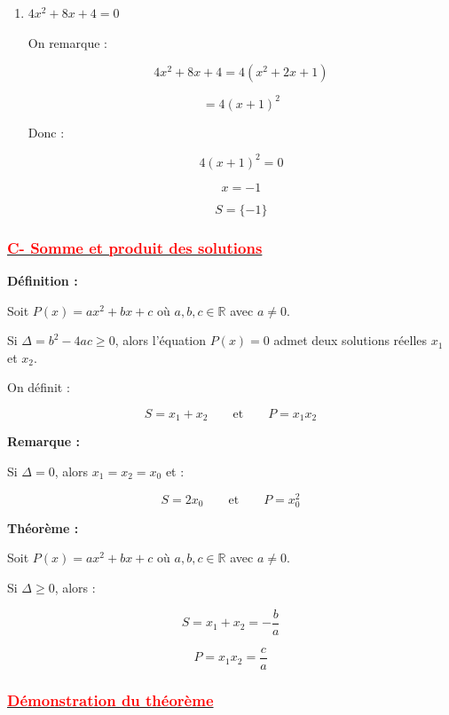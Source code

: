\documentclass[12pt,a4paper]{article}
\newcounter{solution}
\newcounter{remarque}
\begin{document}
\begin{enumerate}
\[
\Delta = 8^2 - 4 \times 6 \times 1
\]
\[
\Delta = 64 - 24 = 40 > 0
\]

\[
x_1 = \frac{-8 - \sqrt{40}}{12}
\qquad
x_2 = \frac{-8 + \sqrt{40}}{12}
\]

Or $\sqrt{40} = 2\sqrt{10}$, donc :

\[
x_1 = \frac{-4 - \sqrt{10}}{6}
\qquad
x_2 = \frac{-4 + \sqrt{10}}{6}
\]

\[
S = \left\{ \frac{-4 - \sqrt{10}}{6} \; ; \; \frac{-4 + \sqrt{10}}{6} \right\}
\]

\item $4x^2 + 8x + 4 = 0$

On remarque :

\[
4x^2 + 8x + 4 = 4(x^2 + 2x + 1)
\]

\[
= 4(x+1)^2
\]

Donc :

\[
4(x+1)^2 = 0
\]

\[
x = -1
\]

\[
S = \{-1\}
\]
\end{enumerate}
\subsubsection*{\underline{\textcolor{red}{C- Somme et produit des solutions}}}

\textbf{Définition :}

Soit $P(x) = ax^2 + bx + c$ où $a,b,c \in \mathbb{R}$ avec $a \neq 0$.

Si $\Delta = b^2 - 4ac \geq 0$, alors l’équation $P(x)=0$ admet deux solutions réelles 
$x_1$ et $x_2$.

On définit :

\[
S = x_1 + x_2
\qquad \text{et} \qquad
P = x_1 x_2
\]

\bigskip

\textbf{Remarque :}

Si $\Delta = 0$, alors $x_1 = x_2 = x_0$ et :

\[
S = 2x_0
\qquad \text{et} \qquad
P = x_0^2
\]

\bigskip

\textbf{Théorème :}

Soit $P(x) = ax^2 + bx + c$ où $a,b,c \in \mathbb{R}$ avec $a \neq 0$.

Si $\Delta \geq 0$, alors :

\[
S = x_1 + x_2 = -\frac{b}{a}
\]

\[
P = x_1 x_2 = \frac{c}{a}
\]
\subsubsection*{\underline{\textcolor{red}{Démonstration du théorème}}}
\end{document}
